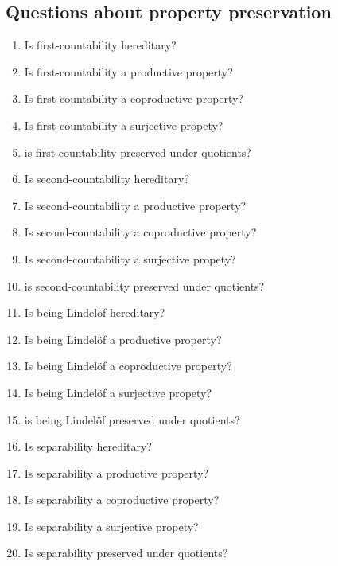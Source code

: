 \subsection{Questions about property preservation}
\begin{enumerate}
    \item Is first-countability hereditary?
    \item Is first-countability a productive property?
    \item Is first-countability a coproductive property?
    \item Is first-countability a surjective propety?
    \item is first-countability preserved under quotients?
    \item Is second-countability hereditary?
    \item Is second-countability a productive property?
    \item Is second-countability a coproductive property?
    \item Is second-countability a surjective propety?
    \item is second-countability preserved under quotients?
    \item Is being Lindel\"of hereditary?
    \item Is being Lindel\"of a productive property?
    \item Is being Lindel\"of a coproductive property?
    \item Is being Lindel\"of a surjective propety?
    \item is being Lindel\"of preserved under quotients?
    \item Is separability hereditary?
    \item Is separability a productive property?
    \item Is separability a coproductive property?
    \item Is separability a surjective propety?
    \item Is separability preserved under quotients?
\end{enumerate}
